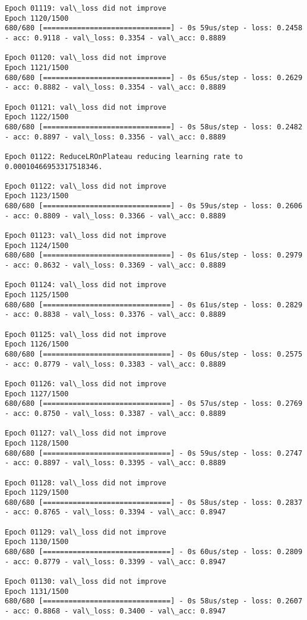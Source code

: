 \documentclass[11pt]{article}
\begin{document}
\begin{Verbatim}[commandchars=\\\{\}]
Epoch 01119: val\_loss did not improve
Epoch 1120/1500
680/680 [==============================] - 0s 59us/step - loss: 0.2458 - acc: 0.9118 - val\_loss: 0.3354 - val\_acc: 0.8889

Epoch 01120: val\_loss did not improve
Epoch 1121/1500
680/680 [==============================] - 0s 65us/step - loss: 0.2629 - acc: 0.8882 - val\_loss: 0.3354 - val\_acc: 0.8889

Epoch 01121: val\_loss did not improve
Epoch 1122/1500
680/680 [==============================] - 0s 58us/step - loss: 0.2482 - acc: 0.8897 - val\_loss: 0.3356 - val\_acc: 0.8889

Epoch 01122: ReduceLROnPlateau reducing learning rate to 0.00010466953317518346.

Epoch 01122: val\_loss did not improve
Epoch 1123/1500
680/680 [==============================] - 0s 59us/step - loss: 0.2606 - acc: 0.8809 - val\_loss: 0.3366 - val\_acc: 0.8889

Epoch 01123: val\_loss did not improve
Epoch 1124/1500
680/680 [==============================] - 0s 61us/step - loss: 0.2979 - acc: 0.8632 - val\_loss: 0.3369 - val\_acc: 0.8889

Epoch 01124: val\_loss did not improve
Epoch 1125/1500
680/680 [==============================] - 0s 61us/step - loss: 0.2829 - acc: 0.8838 - val\_loss: 0.3376 - val\_acc: 0.8889

Epoch 01125: val\_loss did not improve
Epoch 1126/1500
680/680 [==============================] - 0s 60us/step - loss: 0.2575 - acc: 0.8779 - val\_loss: 0.3383 - val\_acc: 0.8889

Epoch 01126: val\_loss did not improve
Epoch 1127/1500
680/680 [==============================] - 0s 57us/step - loss: 0.2769 - acc: 0.8750 - val\_loss: 0.3387 - val\_acc: 0.8889

Epoch 01127: val\_loss did not improve
Epoch 1128/1500
680/680 [==============================] - 0s 59us/step - loss: 0.2747 - acc: 0.8897 - val\_loss: 0.3395 - val\_acc: 0.8889

Epoch 01128: val\_loss did not improve
Epoch 1129/1500
680/680 [==============================] - 0s 58us/step - loss: 0.2837 - acc: 0.8765 - val\_loss: 0.3394 - val\_acc: 0.8947

Epoch 01129: val\_loss did not improve
Epoch 1130/1500
680/680 [==============================] - 0s 60us/step - loss: 0.2809 - acc: 0.8779 - val\_loss: 0.3399 - val\_acc: 0.8947

Epoch 01130: val\_loss did not improve
Epoch 1131/1500
680/680 [==============================] - 0s 58us/step - loss: 0.2607 - acc: 0.8868 - val\_loss: 0.3400 - val\_acc: 0.8947


\end{Verbatim}
\end{document}
